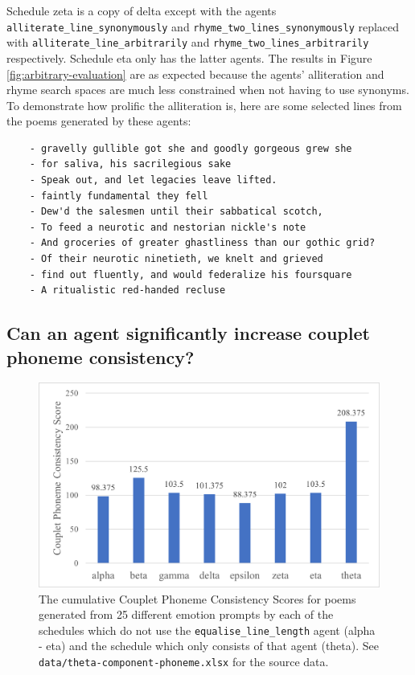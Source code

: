 \documentclass[a4paper,10pt]{article}
\begin{document}
Schedule zeta is a copy of delta except with the agents \texttt{alliterate\_line\_synonymously} and \texttt{rhyme\_two\_lines\_synonymously} replaced with \texttt{alliterate\_line\_arbitrarily} and \texttt{rhyme\_two\_lines\_arbitrarily} respectively. Schedule eta only has the latter agents. The results in Figure \ref{fig:arbitrary-evaluation} are as expected because the agents' alliteration and rhyme search spaces are much less constrained when not having to use synonyms. To demonstrate how prolific the alliteration is, here are some selected lines from the poems generated by these agents:

\begin{verbatim}
    - gravelly gullible got she and goodly gorgeous grew she
    - for saliva, his sacrilegious sake
    - Speak out, and let legacies leave lifted.
    - faintly fundamental they fell
    - Dew'd the salesmen until their sabbatical scotch,
    - To feed a neurotic and nestorian nickle's note
    - And groceries of greater ghastliness than our gothic grid?
    - Of their neurotic ninetieth, we knelt and grieved
    - find out fluently, and would federalize his foursquare
    - A ritualistic red-handed recluse
\end{verbatim}


\subsection{Can an agent significantly increase couplet phoneme consistency?}

\begin{figure}[htb!]
\centering
\includegraphics[width=1\textwidth]{media/theta-component-phoneme.png}
\caption{The cumulative Couplet Phoneme Consistency Scores for poems generated from 25 different emotion prompts by each of the schedules which do not use the \texttt{equalise\_line\_length} agent (alpha - eta) and the schedule which only consists of that agent (theta). See \texttt{data/theta-component-phoneme.xlsx} for the source data.}
\label{fig:theta-component-phoneme}
\end{figure}
\end{document}
